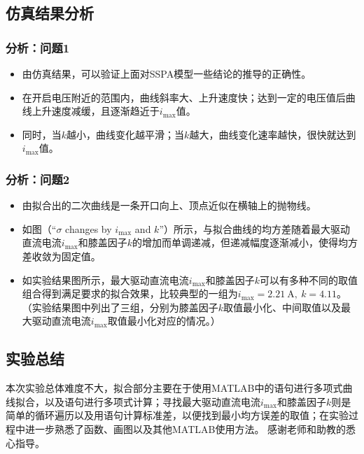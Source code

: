 \documentclass[11pt]{article}
\makeatletter
\renewcommand{\headrulewidth}{0pt} %
\renewcommand{\footrulewidth}{0pt} %
\def\headrule{{\if@fancyplain\let\headrulewidth\plainheadrulewidth\fi %
\hrule\@height 1.5pt \@width\headwidth\vskip1pt %
\hrule\@height 0.5pt\@width\headwidth  %
\vskip-2\headrulewidth\vskip-1pt}      %
  \vspace{6mm}}     %
\providecommand{\tightlist}{\setlength{\itemsep}{0pt}\setlength{\parskip}{0.2pt}}
\makeatother
\begin{document}
\subsection{仿真结果分析}
\subsubsection*{分析：问题1}
\begin{itemize}
    \tightlist
  \item 由仿真结果，可以验证上面对SSPA模型一些结论的推导的正确性。
  \item 在开启电压附近的范围内，曲线斜率大、上升速度快；达到一定的电压值后曲线上升速度减缓，且逐渐趋近于$i_{\mathrm{max}}$值。
  \item 同时，当$k$越小，曲线变化越平滑；当$k$越大，曲线变化速率越快，很快就达到$i_{\mathrm{max}}$值。
\end{itemize}
\subsubsection*{分析：问题2}
\begin{itemize}
  \tightlist
\item 由拟合出的二次曲线是一条开口向上、顶点近似在横轴上的抛物线。
\item 如图（“$\sigma$ changes by $i_{\mathrm{max}}$ and $k$”）所示，与拟合曲线的均方差随着最大驱动直流电流$i_{\mathrm{max}}$和膝盖因子$k$的增加而单调递减，但递减幅度逐渐减小，使得均方差收敛为固定值。
\item 如实验结果图所示，最大驱动直流电流$i_{\mathrm{max}}$和膝盖因子$k$可以有多种不同的取值组合得到满足要求的拟合效果，比较典型的一组为$i_{\mathrm{max}}=2.21 \mathrm{~A},\ k=4.11$。（实验结果图中列出了三组，分别为膝盖因子$k$取值最小化、中间取值以及最大驱动直流电流$i_{\mathrm{max}}$取值最小化对应的情况。）
\end{itemize}

\subsection{实验总结}
本次实验总体难度不大，拟合部分主要在于使用MATLAB中的语句进行多项式曲线拟合，以及语句进行多项式计算；寻找最大驱动直流电流$i_{\mathrm{max}}$和膝盖因子$k$则是简单的循环遍历以及用语句计算标准差，以便找到最小均方误差的取值；在实验过程中进一步熟悉了函数、画图以及其他MATLAB使用方法。
感谢老师和助教的悉心指导。

\newpage
\appendix
\pagestyle{fancy}
\setlength{\topmargin}{-8mm}
\fancyhead[C]{}
\fancyhead[R]{}
\fancyfoot[L]{}
\fancyfoot[C]{}
\fancyfoot[R]{}
\renewcommand{\headrulewidth}{0pt}
\renewcommand{\footrulewidth}{0pt}
\makeatletter %
\def\headrule{}
\makeatother

\end{document}
